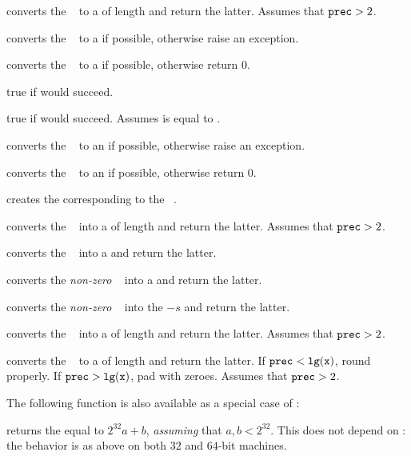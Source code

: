  converts the ~ to a
 of length  and return the latter.
Assumes that ${\tt prec} > 2$.

 converts the ~ to a  if
possible, otherwise raise an exception.

 converts the ~ to a  if
possible, otherwise return $0$.

 true if  would succeed.

 true if  would succeed.
Assumes  is equal to .

 converts the ~ to an  if
possible, otherwise raise an exception.

 converts the ~ to an
 if possible, otherwise return $0$.

 creates the  corresponding to the
~.

 converts the ~ into a
 of length  and return the latter. Assumes that
${\tt prec} > 2$.

 converts the ~ into a 
and return the latter.

 converts the \emph{non-zero} ~
into a  and return the latter.

 converts the \emph{non-zero} ~
into the  $-s$ and return the latter.

 converts the ~ into a
 of length  and return the latter. Assumes that
${\tt prec} > 2$.

 converts the ~ to a
 of length  and return the latter. If
${\tt prec} < {\tt lg(x)}$, round properly. If ${\tt prec} > {\tt lg(x)}$,
pad with zeroes. Assumes that ${\tt prec} > 2$.

\noindent The following function is also available as a special case of
:

 returns the  equal to $2^{32} a +
b$, \emph{assuming} that $a,b < 2^{32}$. This does not depend on
: the behavior is as above on both $32$ and $64$-bit
machines.

